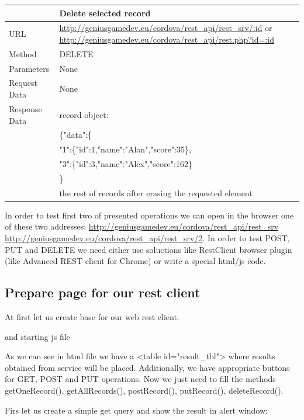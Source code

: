 \begin{tabularx}{\textwidth}{|l|X|}
\hline
&\textbf{Delete selected record}\\\hline
URL &   \url{http://geniusgamedev.eu/cordova/rest_api/rest_srv/:id} or \url{http://geniusgamedev.eu/cordova/rest_api/rest.php?id=:id}\\\hline
Method  & DELETE\\\hline
Parameters  & None \\\hline
Request Data & None\\\hline
Response Data & record object:\\
&
\{"data":\{\\
&"1":\{"id":1,"name":"Alan","score":35\},\\
&"3":\{"id":3,"name":"Alex","score":162\}\\
&\}
\\
&the rest of records after erasing the requested element
\\\hline
\end{tabularx}

In order to test first two of presented operations we can open in the browser one of these two addresses: \url{http://geniusgamedev.eu/cordova/rest_api/rest_srv} \url{http://geniusgamedev.eu/cordova/rest_api/rest_srv/2}. In order to test POST, PUT and DELETE we need either use soluctions like RestClient browser plugin (like Advanced REST client for Chrome) or write a special html/js code.

\subsection{Prepare page for our rest client}
At first let us create base for our web rest client.


and starting js file


\begin{explain}
As we can see in html file we have a <table id="result\_tbl"> where results obtained from service will be placed. Additionally, we have appropriate buttons for GET, POST and PUT operations. Now we just need to fill the methods getOneRecord(), getAllRecords(), postRecord(), putRecord(), deleteRecord().
\end{explain}

Firs let us create a simple get query and show the result in alert window:

